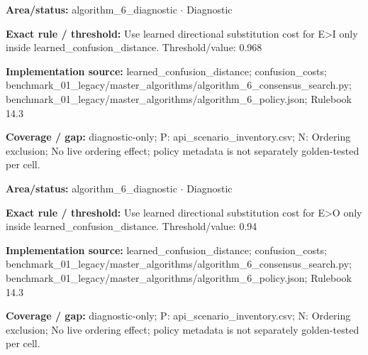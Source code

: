 \begin{tcolorbox}[enhanced,breakable,colback=white,colframe=Muted!45,boxrule=0.45pt,arc=1.5pt,left=6pt,right=6pt,top=5pt,bottom=5pt,title={\texttt{A6-LEARNED-SUBSTITUTION-E-I}},title after break={\texttt{A6-LEARNED-SUBSTITUTION-E-I}\ (continued)},fonttitle=\headingfont\bfseries\color{Navy},coltitle=Navy]
\textbf{Area/status:} algorithm\_\allowbreak{}6\_\allowbreak{}diagnostic $\boldsymbol{\cdot}$ Diagnostic\par
\smallskip
\textbf{Exact rule / threshold:} Use learned directional substitution cost for E>I only inside learned\_\allowbreak{}confusion\_\allowbreak{}distance. Threshold/\allowbreak{}value: 0.968\par
\smallskip
\textbf{Implementation source:} learned\_\allowbreak{}confusion\_\allowbreak{}distance; confusion\_\allowbreak{}costs; benchmark\_\allowbreak{}01\_\allowbreak{}legacy/\allowbreak{}master\_\allowbreak{}algorithms/\allowbreak{}algorithm\_\allowbreak{}6\_\allowbreak{}consensus\_\allowbreak{}search.py; benchmark\_\allowbreak{}01\_\allowbreak{}legacy/\allowbreak{}master\_\allowbreak{}algorithms/\allowbreak{}algorithm\_\allowbreak{}6\_\allowbreak{}policy.json; Rulebook 14.3\par
\smallskip
\textbf{Coverage / gap:} diagnostic-only; P: api\_\allowbreak{}scenario\_\allowbreak{}inventory.csv; N: Ordering exclusion; No live ordering effect; policy metadata is not separately golden-tested per cell.
\end{tcolorbox}
\begin{tcolorbox}[enhanced,breakable,colback=white,colframe=Muted!45,boxrule=0.45pt,arc=1.5pt,left=6pt,right=6pt,top=5pt,bottom=5pt,title={\texttt{A6-LEARNED-SUBSTITUTION-E-O}},title after break={\texttt{A6-LEARNED-SUBSTITUTION-E-O}\ (continued)},fonttitle=\headingfont\bfseries\color{Navy},coltitle=Navy]
\textbf{Area/status:} algorithm\_\allowbreak{}6\_\allowbreak{}diagnostic $\boldsymbol{\cdot}$ Diagnostic\par
\smallskip
\textbf{Exact rule / threshold:} Use learned directional substitution cost for E>O only inside learned\_\allowbreak{}confusion\_\allowbreak{}distance. Threshold/\allowbreak{}value: 0.94\par
\smallskip
\textbf{Implementation source:} learned\_\allowbreak{}confusion\_\allowbreak{}distance; confusion\_\allowbreak{}costs; benchmark\_\allowbreak{}01\_\allowbreak{}legacy/\allowbreak{}master\_\allowbreak{}algorithms/\allowbreak{}algorithm\_\allowbreak{}6\_\allowbreak{}consensus\_\allowbreak{}search.py; benchmark\_\allowbreak{}01\_\allowbreak{}legacy/\allowbreak{}master\_\allowbreak{}algorithms/\allowbreak{}algorithm\_\allowbreak{}6\_\allowbreak{}policy.json; Rulebook 14.3\par
\smallskip
\textbf{Coverage / gap:} diagnostic-only; P: api\_\allowbreak{}scenario\_\allowbreak{}inventory.csv; N: Ordering exclusion; No live ordering effect; policy metadata is not separately golden-tested per cell.
\end{tcolorbox}
